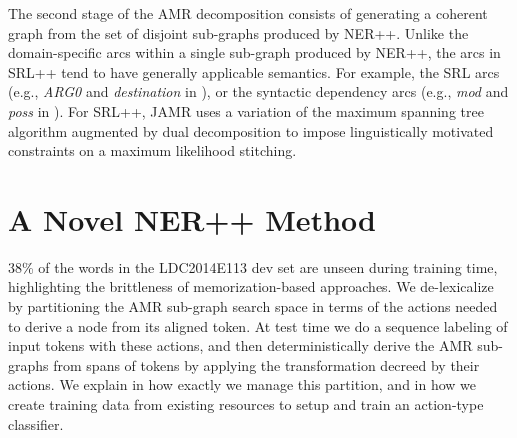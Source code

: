 \documentclass[11pt]{article}
\newcommand\e[1]{\textit{#1}} %
\begin{document}

The second stage of the AMR decomposition consists of generating a coherent graph
  from the set of disjoint sub-graphs produced by NER++.
Unlike the domain-specific arcs within a single sub-graph produced by NER++, the
  arcs in SRL++ tend to have generally applicable semantics.
For example, the SRL arcs (e.g., \e{ARG0} and \e{destination} in ),
  or the syntactic dependency arcs (e.g., \e{mod} and \e{poss} in ).
For SRL++, JAMR uses a variation of the maximum spanning tree algorithm augmented by dual decomposition to impose linguistically motivated constraints on a maximum likelihood stitching. 



\section{A Novel NER++ Method}\label{sec:nerplusplus}
38\% of the words in the LDC2014E113 dev set are 
  unseen during training time, highlighting the brittleness of memorization-based approaches.
We de-lexicalize by partitioning the AMR sub-graph search space in terms of the actions needed to 
  derive a node from its aligned token. 
At test time we do a sequence labeling of input tokens with these actions, and 
  then deterministically derive the AMR sub-graphs from spans of tokens by applying 
  the transformation decreed by their actions. 
We explain in  how exactly we manage this partition, and in  how we create training data from existing resources to setup and train an action-type classifier.
\end{document}
